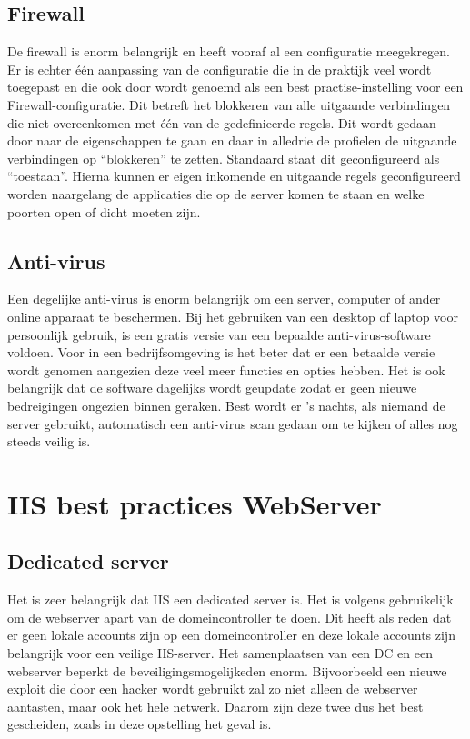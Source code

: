 \documentclass[pdftex,a4paper,12pt]{report}
\begin{document}
\subsection{Firewall}
De firewall is enorm belangrijk en heeft vooraf al een configuratie meegekregen. Er is echter één aanpassing van de configuratie die in de praktijk veel wordt toegepast en die ook door \cite{Nabors2013} wordt genoemd als een best practise-instelling voor een Firewall-configuratie. Dit betreft het blokkeren van alle uitgaande verbindingen die niet overeenkomen met één van de gedefinieerde regels. Dit wordt gedaan door naar de eigenschappen te gaan en daar in alledrie de profielen de uitgaande verbindingen op "`blokkeren"' te zetten. Standaard staat dit geconfigureerd als "`toestaan"'. Hierna kunnen er eigen inkomende en uitgaande regels geconfigureerd worden naargelang de applicaties die op de server komen te staan en welke poorten open of dicht moeten zijn.

\subsection{Anti-virus}
Een degelijke anti-virus is enorm belangrijk om een server, computer of ander online apparaat te beschermen. Bij het gebruiken van een desktop of laptop voor persoonlijk gebruik, is een gratis versie van een bepaalde anti-virus-software voldoen. Voor in een bedrijfsomgeving is het beter dat er een betaalde versie wordt genomen aangezien deze veel meer functies en opties hebben. Het is ook belangrijk dat de software dagelijks wordt geupdate zodat er geen nieuwe bedreigingen ongezien binnen geraken. Best wordt er 's nachts, als niemand de server gebruikt, automatisch een anti-virus scan gedaan om te kijken of alles nog steeds veilig is.

\section{IIS best practices WebServer}
\subsection{Dedicated server}
Het is zeer belangrijk dat IIS een dedicated server is. Het is volgens \cite{Microsoft2013} gebruikelijk om de webserver apart van de domeincontroller te doen. Dit heeft als reden dat er geen lokale accounts zijn op een domeincontroller en deze lokale accounts zijn belangrijk voor een veilige IIS-server. Het samenplaatsen van een DC en een webserver beperkt de beveiligingsmogelijkeden enorm. Bijvoorbeeld een nieuwe exploit die door een hacker wordt gebruikt zal zo niet alleen de webserver aantasten, maar ook het hele netwerk. Daarom zijn deze twee dus het best gescheiden, zoals in deze opstelling het geval is.
\end{document}
